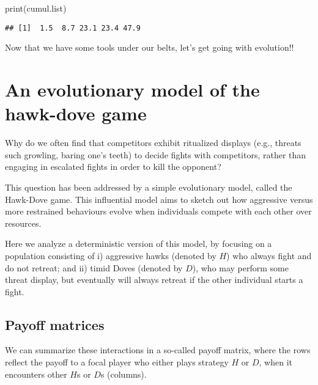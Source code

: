 \documentclass[
]{book}
\newenvironment{Shaded}{\begin{snugshade}}{\end{snugshade}}
\newcommand{\FunctionTok}[1]{\textcolor[rgb]{0.00,0.00,0.00}{#1}}
\newcommand{\NormalTok}[1]{#1}
\begin{document}
\begin{Shaded}
\begin{Highlighting}[]
\FunctionTok{print}\NormalTok{(cumul.list)}
\end{Highlighting}
\end{Shaded}

\begin{verbatim}
## [1]  1.5  8.7 23.1 23.4 47.9
\end{verbatim}

Now that we have some tools under our belts, let's get going with evolution!!

\hypertarget{an-evolutionary-model-of-the-hawk-dove-game}{%
\chapter{An evolutionary model of the hawk-dove game}\label{an-evolutionary-model-of-the-hawk-dove-game}}

Why do we often find that competitors
exhibit ritualized displays
(e.g., threats such growling, baring one's teeth)
to decide fights with competitors,
rather than engaging in escalated fights in order to kill the opponent?

This question has been addressed by a simple evolutionary model,
called the Hawk-Dove game. This influential model aims to sketch out how
aggressive versus more restrained behaviours evolve
when individuals compete with each other over resources.

Here we analyze a deterministic version of this
model, by focusing on a population consisting of i) aggressive hawks (denoted by \(H\)) who
always fight and do not retreat; and ii) timid Doves (denoted by \(D\)), who may perform some
threat display, but eventually will always retreat if the other individual
starts a fight.

\hypertarget{payoff-matrices}{%
\section{Payoff matrices}\label{payoff-matrices}}

We can summarize these interactions in a so-called payoff matrix, where the rows
reflect the payoff to a focal player who either plays strategy \(H\) or \(D\), when it encounters other \(H\)s or \(D\)s (columns).
\end{document}
